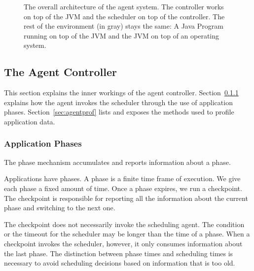 \begin{figure} \label{fig:agentsystem}
\centering
{}
\caption{The overall architecture of the agent system. The controller works on top of the JVM and the scheduler on top of the controller. The rest of the environment (in gray) stays the same: A Java Program running on top of the JVM and the JVM on top of an operating system.}
\end{figure}

\subsection{The Agent Controller}

This section explains the inner workings of the agent controller. Section~\ref{sec:agentphases} explains how the agent invokes the scheduler through the use of application phases. Section~\ref{sec:agentprof} lists and exposes the methods used to profile application data.

\subsubsection{Application Phases} \label{sec:agentphases}

The phase mechanism accumulates and reports information about a phase.

Applications have phases. A phase is a finite time frame of execution. We give each phase a fixed amount of time. Once a phase expires, we run a checkpoint. The checkpoint is responsible for reporting all the information about the current phase and switching to the next one.

The checkpoint does not necessarily invoke the scheduling agent. The condition or the timeout for the scheduler may be longer than the time of a phase. When a checkpoint invokes the scheduler, however, it only consumes information about the last phase. The distinction between phase times and scheduling times is necessary to avoid scheduling decisions based on information that is too old.

